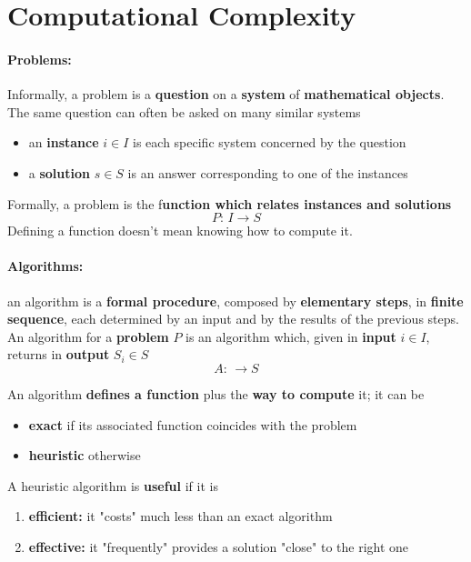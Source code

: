 \section{Computational Complexity}
\paragraph{Problems:} Informally, a problem is a \textbf{question} on a \textbf{system} of \textbf{mathematical objects}. The same question can often be asked on many similar systems
\begin{itemize}
	\item an \textbf{instance} $i \in I$ is each specific system concerned by the question 
	\item a \textbf{solution} $s \in S$ is an answer corresponding to one of the instances
\end{itemize}
Formally, a problem is the f\textbf{unction which relates instances and solutions}
$$ P : \, I \rightarrow S $$
Defining a function doesn't mean knowing how to compute it.\\

\paragraph{Algorithms:} an algorithm is a \textbf{formal procedure}, composed by \textbf{elementary steps}, in \textbf{finite sequence}, each determined by an input and by the results of the previous steps.\\

An algorithm for a \textbf{problem} $P$ is an algorithm which, given in \textbf{input} $i \in I$, returns in \textbf{output} $S_i \in S$
$$ A : \, \rightarrow S $$

An algorithm \textbf{defines a function} plus the \textbf{way to compute} it; it can be
\begin{itemize}
	\item \textbf{exact} if its associated function coincides with the problem
	\item \textbf{heuristic} otherwise
\end{itemize}
A heuristic algorithm is \textbf{useful} if it is
\begin{enumerate}
	\item \textbf{efficient:} it "costs" much less than an exact algorithm
	\item \textbf{effective:} it "frequently" provides a solution "close" to the right one
\end{enumerate}

